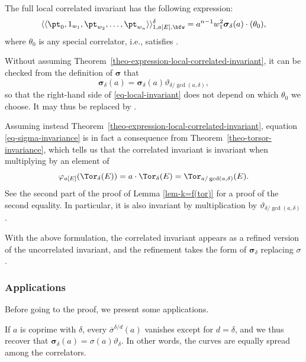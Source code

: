 \begin{theo}\label{theo-expression-local-correlated-invariant}
The full local correlated invariant has the following expression:
\begin{equation}\label{eq-local-invariant}
\langle\langle \pt_0,1_{w_1},\pt_{w_2},\dots,\pt_{w_n}\rangle\rangle^\delta_{1,a[E],\bfw} = a^{n-1}w_1^2 \boldsymbol{\sigma}_\delta(a)
\cdot (\theta_0),
\end{equation}
where $\theta_0$ is any special correlator, i.e., satisfies .
\end{theo}

Without assuming Theorem~\ref{theo-expression-local-correlated-invariant}, it can be checked from the definition of $\boldsymbol{\sigma}$ that
\begin{equation}\label{eq-sigma-invariance}
 \boldsymbol{\sigma}_\delta(a) = \boldsymbol{\sigma}_\delta(a)\vartheta_{\delta/\gcd(a,\delta)},
\end{equation}
so that the right-hand side of \eqref{eq-local-invariant} does not depend on which $\theta_0$ we choose. It may thus be replaced by .

Assuming instead Theorem~\ref{theo-expression-local-correlated-invariant}, equation \eqref{eq-sigma-invariance} is in fact a consequence from Theorem~\ref{theo-torsor-invariance}, which tells us that the correlated invariant is invariant when multiplying by an element of \[\varphi_{a[E]}(\Tor_\delta(E))=a\cdot\Tor_\delta(E)=\Tor_{a/\gcd(a,\delta)}(E).\]
See the second part of the proof of Lemma \ref{lem-k=f(tor)} for a proof of the second equality. In particular, it is also invariant by multiplication by $\vartheta_{\delta/\gcd(a,\delta)}$.

With the above formulation, the correlated invariant appears as a refined version of the uncorrelated invariant, and the refinement takes the form of $\boldsymbol{\sigma}_\delta$ replacing $\sigma$.


\subsubsection{Applications} Before going to the proof, we present some applications.

\begin{expl}
 If $a$ is coprime with $\delta$, every $\overline{\sigma}^{\delta/d}(a)$ vanishes except for $d=\delta$, and we thus recover that
$\boldsymbol{\sigma}_\delta(a) = \sigma(a)\vartheta_\delta$.
 In other words, the curves are equally spread among the correlators.
\end{expl}

